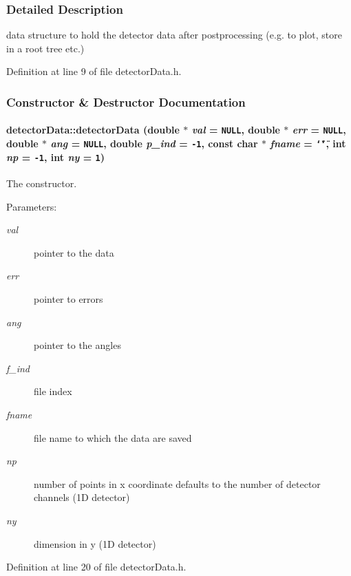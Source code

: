 \subsubsection{Detailed Description}
data structure to hold the detector data after postprocessing (e.g. to plot, store in a root tree etc.) 



Definition at line 9 of file detector\-Data.h.

\subsubsection{Constructor \& Destructor Documentation}
\hypertarget{classdetectorData_3f8538f5f634295fc40682b8aed47b31}{
\paragraph[detectorData]{\setlength{\rightskip}{0pt plus 5cm}detector\-Data::detector\-Data (double $\ast$ {\em val} = {\tt NULL}, double $\ast$ {\em err} = {\tt NULL}, double $\ast$ {\em ang} = {\tt NULL}, double {\em p\_\-ind} = {\tt -1}, const char $\ast$ {\em fname} = {\tt \char`\"{}\char`\"{}}, int {\em np} = {\tt -1}, int {\em ny} = {\tt 1})}\hfill}
\label{classdetectorData_3f8538f5f634295fc40682b8aed47b31}


The constructor. 

\begin{Desc}
\item[Parameters:]
\begin{description}
\item[{\em val}]pointer to the data \item[{\em err}]pointer to errors \item[{\em ang}]pointer to the angles \item[{\em f\_\-ind}]file index \item[{\em fname}]file name to which the data are saved \item[{\em np}]number of points in x coordinate defaults to the number of detector channels (1D detector) \item[{\em ny}]dimension in y (1D detector) \end{description}
\end{Desc}


Definition at line 20 of file detector\-Data.h.

